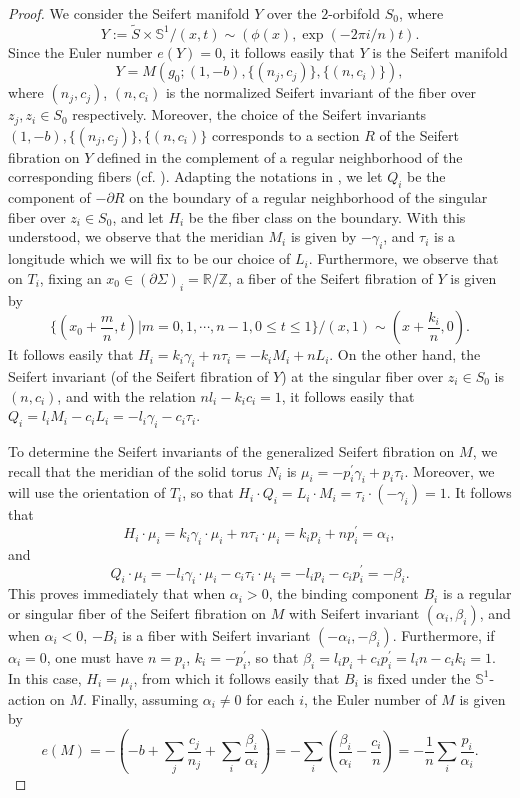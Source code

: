 \documentclass[11pt]{amsart}
\theoremstyle{plain}
\numberwithin{theorem}{section}
\theoremstyle{definition}
\newcommand{\R}{{\mathbb R}}
\newcommand{\Z}{{\mathbb Z}}
\newcommand{\s}{{\mathbb S}}
\begin{document}
\begin{proof}
We consider the Seifert manifold $Y$ over the $2$-orbifold $S_0$, where 
$$
Y:=\tilde{S}\times \s^1/(x,t)\sim (\phi(x), \exp(-2\pi i/n) t).
$$
Since the Euler number $e(Y)=0$, it follows easily that $Y$ is the Seifert manifold 
$$
Y=M(g_0; (1,-b), \{(n_j,c_j)\}, \{(n,c_i)\}),
$$
where $(n_j,c_j)$, $(n,c_i)$ is the normalized Seifert invariant of the fiber over $z_j,z_i\in S_0$ respectively. Moreover, the choice of the Seifert invariants $(1,-b), \{(n_j,c_j)\}, \{(n,c_i)\}$ corresponds to a section $R$ of the Seifert fibration on $Y$ defined in the complement of a regular neighborhood of the corresponding fibers (cf. \cite{N}). Adapting the notations in \cite{N}, we let $Q_i$ be the component of $-\partial R$ on the boundary of a regular neighborhood of the singular fiber over $z_i\in S_0$, and let $H_i$ be the fiber class on the boundary. With this understood, we observe that the meridian $M_i$ is given by $-\gamma_i$, and $\tau_i$ is a longitude which we will fix to be our choice of $L_i$. Furthermore, we observe that on $T_i$, fixing an $x_0\in (\partial \Sigma)_i=\R/\Z$, a fiber of the Seifert fibration of $Y$ is given by 
$$
\{(x_0+\frac{m}{n}, t)| m=0,1,\cdots, n-1, 0\leq t\leq 1\}/(x,1)\sim (x+\frac{k_i}{n},0).
$$
It follows easily that $H_i=k_i\gamma_i+n\tau_i=-k_i M_i+n L_i$. On the other hand, the Seifert invariant (of the Seifert fibration of $Y$) at the singular fiber over $z_i\in S_0$ is $(n,c_i)$, and with
the relation $nl_i-k_ic_i=1$, it follows easily that $Q_i=l_i M_i-c_i L_i=-l_i\gamma_i-c_i\tau_i$.

To determine the Seifert invariants of the generalized Seifert fibration on $M$, we recall that the 
meridian of the solid torus $N_i$ is $\mu_i=-p^\prime_i\gamma_i+p_i\tau_i$. Moreover, 
we will use the orientation of $T_i$, so that $H_i\cdot Q_i=L_i\cdot M_i=\tau_i\cdot (-\gamma_i)=1$.
It follows that
$$
H_i\cdot\mu_i=k_i\gamma_i\cdot\mu_i+ n\tau_i\cdot\mu_i=k_ip_i+np^\prime_i=\alpha_i,
$$
and
$$
Q_i\cdot \mu_i=-l_i\gamma_i\cdot\mu_i-c_i\tau_i\cdot\mu_i=-l_ip_i-c_i p^\prime_i=-\beta_i.
$$
This proves immediately that when $\alpha_i>0$, the binding component $B_i$ is a regular 
or singular fiber of the Seifert fibration on $M$ with Seifert invariant $(\alpha_i,\beta_i)$, and when
$\alpha_i<0$, $-B_i$ is a fiber with Seifert invariant $(-\alpha_i,-\beta_i)$. Furthermore, if
$\alpha_i=0$, one must have $n=p_i$, $k_i=-p^\prime_i$, so that $\beta_i=l_ip_i+c_ip^\prime_i=
l_in-c_ik_i=1$. In this case, $H_i=\mu_i$, from which it follows easily that $B_i$ is fixed under the
$\s^1$-action on $M$. Finally, assuming $\alpha_i\neq 0$ for each $i$, the Euler number of $M$ is given by 
$$
e(M)= -(-b+\sum_j \frac{c_j}{n_j}+\sum_i \frac{\beta_i}{\alpha_i})=-\sum_i (\frac{\beta_i}{\alpha_i}-
\frac{c_i}{n})=-\frac{1}{n} \sum_i \frac{p_i}{\alpha_i}.
$$
\end{proof}
\end{document}
